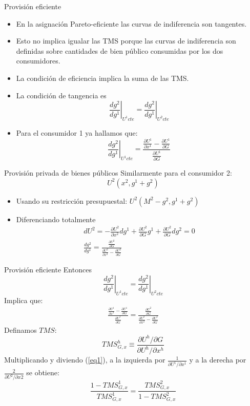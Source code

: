 \begin{frame}{Provisión eficiente}
	\begin{itemize}
		\item En la asignación Pareto-eficiente las curvas de indiferencia son tangentes.
		\item Esto no implica igualar las TMS porque las curvas de indiferencia son definidas sobre cantidades de bien público consumidas por los dos consumidores.
		\item La condición de eficiencia implica la suma de las TMS.
		\item La condición de tangencia es
				$$\left. \frac{dg^2}{dg^1}\right|_{U^1 cte} = \left. \frac{dg^2}{dg^1}\right|_{U^2 cte}$$
		\item Para el consumidor 1 ya hallamos que:
				$$\left. \frac{dg^2}{dg^1}\right|_{U^1 cte} = \frac{\frac{\partial U^1}{\partial x^1} - \frac{\partial U^1}{\partial G}}{\frac{\partial U^1}{\partial G}}$$
	\end{itemize}
\end{frame}
\begin{frame}{Provisión privada de bienes públicos}
	Similarmente para el consumidor 2:
		$$U^2\left( x^2, g^1 + g^2\right)$$
			\begin{itemize}
				\item Usando su restricción presupuestal: $U^2\left( M^2 - g^2, g^1 + g^2\right)$
				\item Diferenciando totalmente
				\begin{gather*}
					dU^2 = -\frac{\partial U^2}{\partial x^2}dg^1+\frac{\partial U^2}{\partial G}g^1 + \frac{\partial U^2}{\partial G}dg^2 = 0\\[0.3cm]
					\frac{dg^2}{dg^1} = \frac{\frac{\partial U^2}{\partial G}}{\frac{\partial U^2}{\partial x^2} - \frac{\partial U^2}{\partial G}}
				\end{gather*}
			\end{itemize}
\end{frame}
\begin{frame}{Provisión eficiente}
	Entonces
		$$\left. \frac{dg^2}{dg^1}\right|_{U^1 cte} = \left. \frac{dg^2}{dg^1}\right|_{U^2 cte}$$
	Implica que:
		\begin{gather}
			\frac{\frac{\partial U^1}{\partial x^1} - \frac{\partial U^1}{\partial G}}{\frac{\partial U^1}{\partial G}} = \frac{\frac{\partial U^2}{\partial G}}{\frac{\partial U^2}{\partial x^2} - \frac{\partial U^2}{\partial G}} \label{eq1}
		\end{gather}
	Definamos $TMS$:
		$$TMS_{G,x}^{h} \equiv \frac{\partial U^h/\partial G}{\partial U^h/\partial x^h}$$
	Multiplicando y diviendo (\ref{eq1}), a la izquierda por $\frac{1}{\partial U^1/\partial x^1}$ y a la derecha por $\frac{2}{\partial U^2/\partial x2}$ se obtiene:
		$$\frac{1 - TMS_{G,x}^1}{TMS_{G,x}^1} = \frac{TMS_{G,x}^2}{1-TMS_{G,x}^2}$$
\end{frame}
